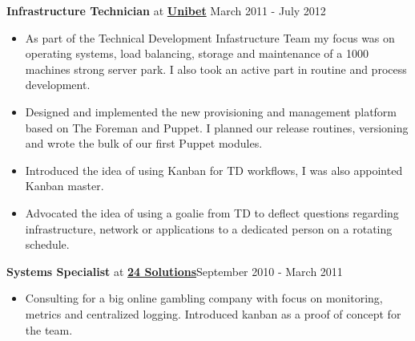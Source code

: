 \documentclass[8pt]{article}
\newenvironment{outerlist}[1][\enskip\textbullet]%
        {\begin{itemize}[#1]}{\end{itemize}%
         \vspace{-.6\baselineskip}}
\newcommand{\blankline}{\quad\pagebreak[2]}
\begin{document}
\textbf{Infrastructure Technician} at \href{http://www.unibet.com}{\textbf{Unibet}}  \hfill {March 2011 - July 2012}
\begin{outerlist}
	\item[] As part of the Technical Development Infastructure Team my focus was on operating systems, load balancing, storage and maintenance of a 1000 machines strong server park. I also took an active part in routine and process development. 
	 \item Designed and implemented the new provisioning and management platform based on The Foreman and Puppet. I planned our release routines, versioning and wrote the bulk of our first Puppet modules.
	\item Introduced the idea of using Kanban for TD workflows, I was also appointed Kanban master.
	\item Advocated the idea of using a goalie from TD to deflect questions regarding infrastructure, network or applications to a dedicated person on a rotating schedule.
	
\end{outerlist}
\blankline

 \textbf{Systems Specialist} at \href{http://www.24solutions.se}{\textbf{24 Solutions}}\hfill {September 2010 - March 2011}
\begin{outerlist}
	\item[] Consulting for a big online gambling company with focus on monitoring, metrics and centralized logging. Introduced kanban as a proof of concept for the team.
\end{outerlist}
\blankline
\end{document}
